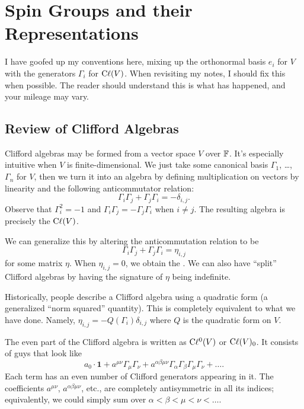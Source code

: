 \chapter{Spin Groups and their Representations}

\begin{ddanger}
I have goofed up my conventions here, mixing up the orthonormal basis
$e_{i}$ for $V$ with the generators $\Gamma_{i}$ for $\mathrm{C}\ell(V)$. When
revisiting my notes, I should fix this when possible. The reader should
understand this is what has happened, and your mileage may vary.
\end{ddanger}

\section{Review of Clifford Algebras}

\M
Clifford algebras may be formed from a vector space $V$ over $\mathbb{F}$. It's
especially intuitive when $V$ is finite-dimensional. We just take some
canonical basis $\Gamma_{1}$, \dots, $\Gamma_{n}$ for $V$, then we turn it into an
algebra by defining multiplication on vectors by linearity and the
following anticommutator relation:
\begin{equation}
\Gamma_{i}\Gamma_{j} + \Gamma_{j}\Gamma_{i} = -\delta_{i,j}.
\end{equation}
Observe that $\Gamma_{i}^{2}=-1$ and $\Gamma_{i}\Gamma_{j}=-\Gamma_{j}\Gamma_{i}$ when $i\neq j$.
The resulting algebra is precisely the  $\mathrm{C}\ell(V)$.

We can generalize this by altering the anticommutation relation to be
\begin{equation}
\Gamma_{i}\Gamma_{j} + \Gamma_{j}\Gamma_{i} = \eta_{i,j}
\end{equation}
for some matrix $\eta$. When $\eta_{i,j}=0$, we obtain the
. We can also have ``split'' Clifford algebras
by having the signature of $\eta$ being indefinite.

\begin{remark}
Historically, people describe a Clifford algebra using a quadratic form
(a generalized ``norm squared'' quantity). This is completely equivalent
to what we have done. Namely, $\eta_{i,j}=-Q(\Gamma_{i})\delta_{i,j}$ where
$Q$ is the quadratic form on $V$.
\end{remark}

The even part of the Clifford algebra is written as $\mathrm{C}\ell^{0}(V)$ or
$\mathrm{C}\ell(V)_{0}$. It consists of guys that look like
\[ a_{0}\cdot\mathbf{1} + a^{\mu\nu}\Gamma_{\mu}\Gamma_{\nu} + a^{\alpha\beta\mu\nu}\Gamma_{\alpha}\Gamma_{\beta}\Gamma_{\mu}\Gamma_{\nu}+\dots.\]
Each term has an even number of Clifford generators appearing in it. The
coefficients $a^{\mu\nu}$, $a^{\alpha\beta\mu\nu}$, etc., are completely
antisymmetric in all its indices; equivalently, we could simply sum over
$\alpha<\beta<\mu<\nu<\dots$. 

